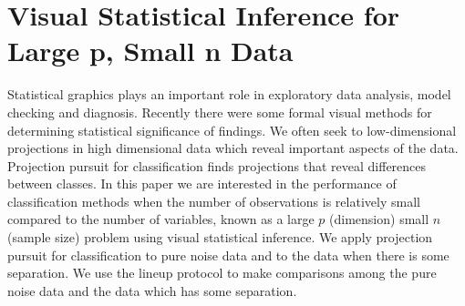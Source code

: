 \documentclass[12]{report}
\begin{document}
%
%
%
%
%
 


\chapter{Visual Statistical Inference for Large p, Small n Data}\label{ch:largepsmalln}

Statistical graphics plays an important role in exploratory data analysis, model checking and diagnosis. Recently there were some formal visual methods for determining statistical significance of findings. We often seek to low-dimensional projections in high dimensional data which reveal important aspects of the data. Projection pursuit for classification finds projections that reveal differences between classes. In this paper we are interested in the performance of classification methods when the number of observations is relatively small compared to the number of variables, known as a large $p$ (dimension) small $n$ (sample size) problem using visual statistical inference. We apply projection pursuit for classification to pure noise data and to the data when there is some separation. We use the lineup protocol \cite{buja:2009} to make comparisons among the pure noise data and the data which has some separation.
\end{document}
